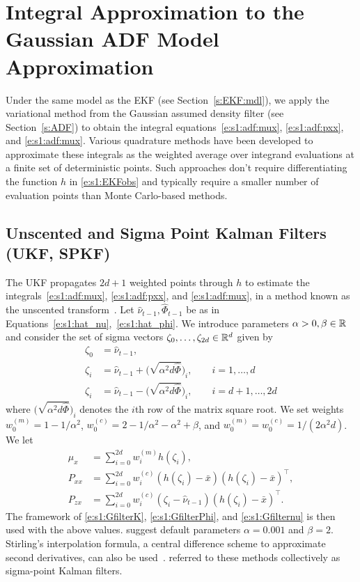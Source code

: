 \section{Integral Approximation to the Gaussian ADF Model Approximation}

Under the same model as the EKF (see Section~\ref{s:EKF:mdl}), we apply the variational method from the Gaussian assumed density filter (see Section~\ref{s:ADF}) to obtain the integral equations~\eqref{e:s1:adf:mux}, \eqref{e:s1:adf:pxx}, and \eqref{e:s1:adf:mux}.  Various quadrature methods have been developed to approximate these integrals as the weighted average over integrand evaluations at a finite set of deterministic points.  Such approaches don't require differentiating the function $h$ in \eqref{e:s1:EKFobs} and typically require a smaller number of evaluation points than Monte Carlo-based methods.

\subsection{Unscented and Sigma Point Kalman Filters (UKF, SPKF)}\label{s:ukf} 
The UKF propagates $2d+1$ weighted points through $h$ to estimate the integrals~\eqref{e:s1:adf:mux}, \eqref{e:s1:adf:pxx}, and \eqref{e:s1:adf:mux}, in a method known as the unscented transform~\cite{Jul97}.  Let $\hat \nu_{t-1},\hat \Phi_{t-1}$ be as in Equations~\ref{e:s1:hat_nu},~\ref{e:s1:hat_phi}.  We introduce parameters $\alpha>0,\beta\in\mathbb{R}$~\cite{Wan00} and consider the set of sigma vectors $\zeta_0,\dotsc,\zeta_{2d}\in\mathbb{R}^{d}$ given by
\begin{align}
\zeta_0 &= \hat\nu_{t-1}, \\
\zeta_i &= \hat\nu_{t-1} + \big(\sqrt{\alpha^2d\hat\Phi}\big)_i,\qquad i = 1,\dotsc, d \\
\zeta_i &= \hat\nu_{t-1} - \big(\sqrt{\alpha^2d\hat\Phi}\big)_i,\qquad i = d+1,\dotsc, 2d
\end{align}
where $\big(\sqrt{\alpha^2d\hat\Phi}\big)_i$ denotes the $i$th row of the matrix square root.  We set weights $w_0^{(m)}=1-1/\alpha^2$, $w_0^{(c)}=2-1/\alpha^2-\alpha^2+\beta$, and $w_0^{(m)}=w_0^{(c)}=1/(2\alpha^2d)$.  We let
\begin{align}
\mu_x &= \sum_{i=0}^{2d} w_i^{(m)}h(\zeta_i), \\
P_{xx} &= \sum_{i=0}^{2d} w_i^{(c)}(h(\zeta_i)-\bar x)(h(\zeta_i)-\bar x)^\intercal, \\
P_{zx} &= \sum_{i=0}^{2d} w_i^{(c)}(\zeta_i-\hat\nu_{t-1})(h(\zeta_i)-\bar x)^\intercal.
\end{align}
The framework of  \eqref{e:s1:GfilterK}, \eqref{e:s1:GfilterPhi}, and \eqref{e:s1:Gfilternu} is then used with the above values.  \textcite{Wan00} suggest default parameters $\alpha=0.001$ and $\beta = 2$.  Stirling's interpolation formula, a central difference scheme to approximate second derivatives, can also be used~\cite[the Central Difference Kalman filter (CDKF) of][]{Ito00b, Nor00}.  \textcite{van04} referred to these methods collectively as sigma-point Kalman filters.

